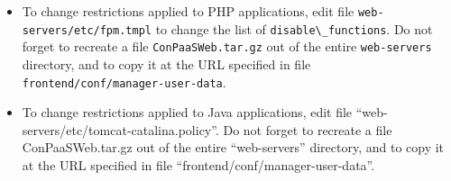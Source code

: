 \documentclass[10pt]{article}
\begin{document}
\begin{itemize}
\item To change restrictions applied to PHP applications, edit file
  \verb+web-servers/etc/fpm.tmpl+ to change the list of
  \verb+disable\_functions+. Do not forget to recreate a file
  \verb+ConPaaSWeb.tar.gz+ out of the entire \verb+web-servers+
  directory, and to copy it at the URL specified in file
  \verb+frontend/conf/manager-user-data+.
\item To change restrictions applied to Java applications, edit file
  ``web-servers/etc/tomcat-catalina.policy''. Do not forget to
  recreate a file ConPaaSWeb.tar.gz out of the entire ``web-servers''
  directory, and to copy it at the URL specified in file
  ``frontend/conf/manager-user-data''.
\end{itemize}
\end{document}
